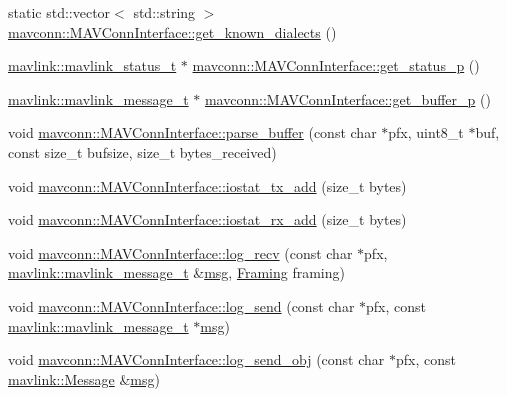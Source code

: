 \begin{DoxyCompactItemize}
static std\+::vector$<$ std\+::string $>$ \mbox{\hyperlink{group__mavconn_ga443165dafa8e6827e340e92768a07a12}{mavconn\+::\+M\+A\+V\+Conn\+Interface\+::get\+\_\+known\+\_\+dialects}} ()
\item 
\mbox{\hyperlink{include__v2_80_2mavlink__types_8h_aec6f7af3879252822d8fb108e97aafc2}{mavlink\+::mavlink\+\_\+status\+\_\+t}} $\ast$ \mbox{\hyperlink{group__mavconn_ga2bb422475644d340b8116f7d67253dde}{mavconn\+::\+M\+A\+V\+Conn\+Interface\+::get\+\_\+status\+\_\+p}} ()
\item 
\mbox{\hyperlink{include__v0_89_2mavlink__types_8h_a63b963764c09dc72f4910c1521e325b9}{mavlink\+::mavlink\+\_\+message\+\_\+t}} $\ast$ \mbox{\hyperlink{group__mavconn_gae9521a7ebe812821fcd15a63f1c12b10}{mavconn\+::\+M\+A\+V\+Conn\+Interface\+::get\+\_\+buffer\+\_\+p}} ()
\item 
void \mbox{\hyperlink{group__mavconn_ga5086c8460510e92da4e86fb266cb5a8b}{mavconn\+::\+M\+A\+V\+Conn\+Interface\+::parse\+\_\+buffer}} (const char $\ast$pfx, uint8\+\_\+t $\ast$buf, const size\+\_\+t bufsize, size\+\_\+t bytes\+\_\+received)
\item 
void \mbox{\hyperlink{group__mavconn_gaabfc001375565bdafd47172374fcda0f}{mavconn\+::\+M\+A\+V\+Conn\+Interface\+::iostat\+\_\+tx\+\_\+add}} (size\+\_\+t bytes)
\item 
void \mbox{\hyperlink{group__mavconn_gab045ff5b6e55b96630f00e131e4d2c16}{mavconn\+::\+M\+A\+V\+Conn\+Interface\+::iostat\+\_\+rx\+\_\+add}} (size\+\_\+t bytes)
\item 
void \mbox{\hyperlink{group__mavconn_ga6edf345e262423905ecd6da2966d7b4f}{mavconn\+::\+M\+A\+V\+Conn\+Interface\+::log\+\_\+recv}} (const char $\ast$pfx, \mbox{\hyperlink{include__v0_89_2mavlink__types_8h_a63b963764c09dc72f4910c1521e325b9}{mavlink\+::mavlink\+\_\+message\+\_\+t}} \&\mbox{\hyperlink{stratnode_8cpp_a82cfe4ed9bc9e1b07c8bf209c324d85b}{msg}}, \mbox{\hyperlink{group__mavconn_gac93e6f8262bcc6008b4882ae6213f494}{Framing}} framing)
\item 
void \mbox{\hyperlink{group__mavconn_ga7a6bcc0b1c21c9016422e2c20b4b04d0}{mavconn\+::\+M\+A\+V\+Conn\+Interface\+::log\+\_\+send}} (const char $\ast$pfx, const \mbox{\hyperlink{include__v0_89_2mavlink__types_8h_a63b963764c09dc72f4910c1521e325b9}{mavlink\+::mavlink\+\_\+message\+\_\+t}} $\ast$\mbox{\hyperlink{stratnode_8cpp_a82cfe4ed9bc9e1b07c8bf209c324d85b}{msg}})
\item 
void \mbox{\hyperlink{group__mavconn_ga52bf39da3102cf3376a801f5b0f647a5}{mavconn\+::\+M\+A\+V\+Conn\+Interface\+::log\+\_\+send\+\_\+obj}} (const char $\ast$pfx, const \mbox{\hyperlink{structmavlink_1_1Message}{mavlink\+::\+Message}} \&\mbox{\hyperlink{stratnode_8cpp_a82cfe4ed9bc9e1b07c8bf209c324d85b}{msg}})

\end{DoxyCompactItemize}
